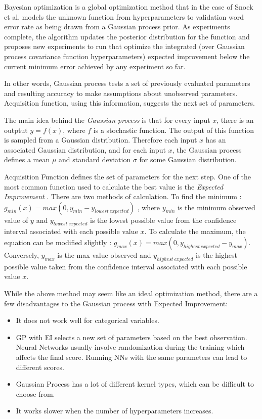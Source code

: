 \documentclass[twoside]{article}
\begin{document}
\begin{itemize}
Bayesian optimization is a 
global optimization method that in the case of Snoek et al.
models the unknown function from hyperparameters to validation
word error rate as being drawn from a Gaussian process
prior. As experiments complete, the algorithm updates
the posterior distribution for the function and proposes new
experiments to run that optimize the integrated (over Gaussian
process covariance function hyperparameters) expected
improvement below the current minimum error achieved by
any experiment so far. \cite{snoek2012practical}

In other words, Gaussian process tests a set of previously evaluated parameters and resulting accuracy to make assumptions about unobserved parameters. Acquisition function, using this information, suggests the next set of parameters.


The main idea behind the \textit{Gaussian process} is that for every input $x$, there is an outptut $y = f(x)$, where $f$ is a stochastic function. The output of this function is sampled from a Gaussian distribution. Therefore each input $x$ has an associated Gaussian distribution, and for each input $x$, the Gaussian process defines a mean $\mu$ and standard deviation $\sigma$ for some Gaussian distribution.

Acquisition Function defines the set of parameters for the next step. One of the most common function used to calculate the best value is the \textit{Expected Improvement} \cite{snoek2012practical}. There are two methods of calculation. To find the minimum : $g_{min}(x) = max(0, y_{min} - y_{lowest\ expected})$ , where $y_{min}$ is the minimum observed value of $y$ and $y_{lowest\ expected}$ is the lowest possible value from the confidence interval associated with each possible value $x$. To calculate the maximum, the equation can be modified slightly :
$g_{max}(x) = max(0, y_{highest\ expected} - y_{max})$. Conversely, $y_{max}$ is the max value observed and $y_{highest\ expected}$ is the highest possible value taken from the confidence interval associated with each possible value $x$.

While the above method may seem like an ideal optimization method, there are a few disadvantages to the Gaussian process with Expected Improvement:
\begin{itemize}
\item It does not work well for categorical variables. 
\item GP with EI selects a new set of parameters based on the best observation. Neural Networks usually involve randomization during the training which affects the final score. Running NNs with the same parameters can lead to different scores.
\item Gaussian Process has a lot of different kernel types, which can be difficult to choose from.
\item It works slower when the number of hyperparameters increases.
\end{itemize}
 


\end{itemize}
\end{document}
